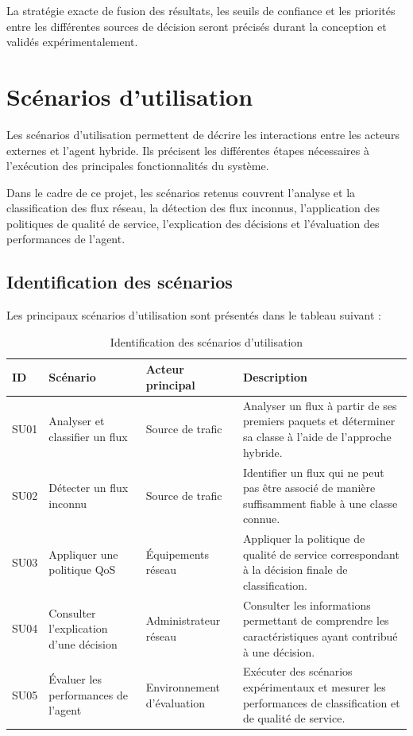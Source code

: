 La stratégie exacte de fusion des résultats, les seuils
de confiance et les priorités entre les différentes sources
de décision seront précisés durant la conception et validés
expérimentalement.


\section{Scénarios d'utilisation}

Les scénarios d'utilisation permettent de décrire les
interactions entre les acteurs externes et l'agent hybride.
Ils précisent les différentes étapes nécessaires à
l'exécution des principales fonctionnalités du système.

Dans le cadre de ce projet, les scénarios retenus couvrent
l'analyse et la classification des flux réseau, la détection
des flux inconnus, l'application des politiques de qualité
de service, l'explication des décisions et l'évaluation
des performances de l'agent.

\subsection{Identification des scénarios}

Les principaux scénarios d'utilisation sont présentés
dans le tableau suivant :

\begin{table}[H]
\centering
\caption{Identification des scénarios d'utilisation}
\label{tab:scenarios-utilisation}
\small
\begin{tabularx}{\textwidth}{|p{1.4cm}|p{4cm}|p{3.2cm}|Y|}
\hline
\textbf{ID} & \textbf{Scénario} & \textbf{Acteur principal} &
\textbf{Description} \\
\hline

SU01 & Analyser et classifier un flux &
Source de trafic &
Analyser un flux à partir de ses premiers paquets et
déterminer sa classe à l'aide de l'approche hybride. \\
\hline

SU02 & Détecter un flux inconnu &
Source de trafic &
Identifier un flux qui ne peut pas être associé de manière
suffisamment fiable à une classe connue. \\
\hline

SU03 & Appliquer une politique QoS &
Équipements réseau &
Appliquer la politique de qualité de service correspondant
à la décision finale de classification. \\
\hline

SU04 & Consulter l'explication d'une décision &
Administrateur réseau &
Consulter les informations permettant de comprendre
les caractéristiques ayant contribué à une décision. \\
\hline

SU05 & Évaluer les performances de l'agent &
Environnement d'évaluation &
Exécuter des scénarios expérimentaux et mesurer les
performances de classification et de qualité de service. \\
\hline

\end{tabularx}
\end{table}


